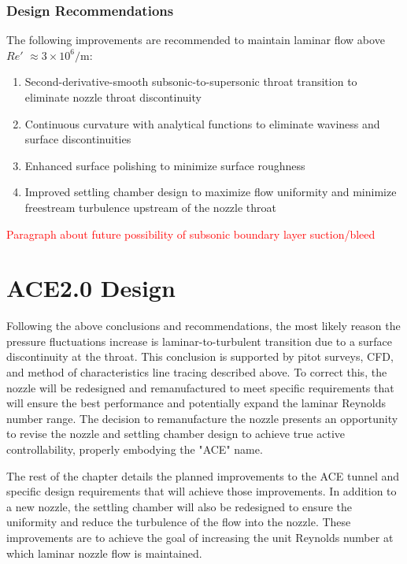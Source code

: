 \subsubsection*{Design Recommendations}

The following improvements are recommended to maintain laminar flow above $Re'$ $\approx 3 \times 10^6/\mathrm{m}$:
\begin{enumerate}
    \item Second-derivative-smooth subsonic-to-supersonic throat transition to eliminate nozzle throat discontinuity
    \item Continuous curvature with analytical functions to eliminate waviness and surface discontinuities
    \item Enhanced surface polishing to minimize surface roughness
    \item Improved settling chamber design to maximize flow uniformity and minimize freestream turbulence upstream of the nozzle throat
\end{enumerate}

\textcolor{red}{Paragraph about future possibility of subsonic boundary layer suction/bleed}

\section{ACE2.0 Design}

Following the above conclusions and recommendations, the most likely reason the pressure fluctuations increase is laminar-to-turbulent transition due to a surface discontinuity at the throat. This conclusion is supported by pitot surveys, CFD, and method of characteristics line tracing described above. To correct this, the nozzle will be redesigned and remanufactured to meet specific requirements that will ensure the best performance and potentially expand the laminar Reynolds number range. The decision to remanufacture the nozzle presents an opportunity to revise the nozzle and settling chamber design to achieve true active controllability, properly embodying the "ACE" name.

The rest of the chapter details the planned improvements to the ACE tunnel and specific design requirements that will achieve those improvements. In addition to a new nozzle, the settling chamber will also be redesigned to ensure the uniformity and reduce the turbulence of the flow into the nozzle. These improvements are to achieve the goal of increasing the unit Reynolds number at which laminar nozzle flow is maintained.

